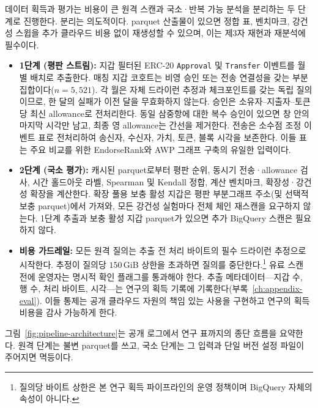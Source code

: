 
데이터 획득과 평가는 비용이 큰 원격 스캔과 국소·반복 가능 분석을 분리하는 두 단계로 진행한다. 분리는 의도적이다. parquet 산출물이 있으면 정합 표, 벤치마크, 강건성 스윕을 추가 클라우드 비용 없이 재생성할 수 있으며, 이는 제3자 재현과 재분석에 필수이다.

\begin{itemize}
\item \textbf{1단계 (평판 스트림):} 지갑 필터된 ERC-20 \texttt{Approval} 및 \texttt{Transfer} 이벤트를 월별 배치로 추출한다. 매칭 지갑 코호트는 비영 승인 또는 전송 연결성을 갖는 부분집합이다($n=5{,}521$). 각 월은 자체 드라이런 추정과 체크포인트를 갖는 독립 질의이므로, 한 달의 실패가 이전 달을 무효화하지 않는다. 승인은 소유자--지출자--토큰당 최신 allowance로 전처리한다. 동일 삼중항에 대한 복수 승인이 있으면 창 안의 마지막 시각만 남고, 최종 영 allowance는 간선을 제거한다. 전송은 소수점 조정 이벤트 표로 전처리하여 송신자, 수신자, 가치, 토큰, 블록 시각을 보존한다. 이들 표는 주요 비교를 위한 EndorseRank와 AWP 그래프 구축의 유일한 입력이다.

\item \textbf{2단계 (국소 평가):} 캐시된 parquet로부터 평판 순위, 동시기 전송·allowance 검사, 시간 홀드아웃 라벨, Spearman 및 Kendall 정합, 계산 벤치마크, 확장성·강건성 확장을 계산한다. 확장 풀용 보충 활성 지갑은 평판 부분그래프 주소(및 선택적 보충 parquet)에서 가져와, 모든 강건성 실험마다 전체 체인 재스캔을 요구하지 않는다. 1단계 추출과 보충 활성 지갑 parquet가 있으면 추가 BigQuery 스캔은 필요하지 않다.

\item \textbf{비용 가드레일:} 모든 원격 질의는 추출 전 처리 바이트의 필수 드라이런 추정으로 시작한다. 추정이 질의당 $150$\,GiB 상한을 초과하면 질의를 중단한다.\footnote{질의당 바이트 상한은 본 연구 획득 파이프라인의 운영 정책이며 BigQuery 자체의 속성이 아니다.} 유료 스캔 전에 운영자는 명시적 확인 플래그를 통과해야 한다. 추출 메타데이터---지갑 수, 행 수, 처리 바이트, 시각---는 연구의 획득 기록에 기록한다(부록~\ref{ch:appendix-eval}). 이들 통제는 공개 클라우드 자원의 책임 있는 사용을 구현하고 연구의 획득 비용을 감사 가능하게 한다.

\end{itemize}


그림~\ref{fig:pipeline-architecture}는 공개 로그에서 연구 표까지의 종단 흐름을 요약한다. 원격 단계는 불변 parquet를 쓰고, 국소 단계는 그 입력과 단일 버전 설정 파일이 주어지면 멱등이다.

